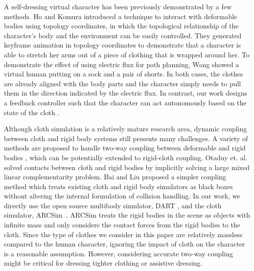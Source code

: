 A self-dressing virtual character has been previously demonstrated by a
few methods. Ho and Komura  introduced a technique
to interact with deformable bodies using topology coordinates, in which
the topological relationship of the character's body and the environment
can be easily controlled. They generated keyframe animation in topology
coordinates to demonstrate that a character is able to stretch her arms
out of a piece of clothing that is wrapped around her. To demonstrate the
effect of using electric flux for path planning, Wang \etal
{} showed a virtual human putting on a sock and a
pair of shorts. In both cases, the clothes are already aligned with the
body parts and the character simply needs to pull them in the direction
indicated by the electric flux.   In contrast, our
work designs a feedback controller such that the character can act
autonomously based on the state of the cloth .



Although cloth simulation is a relatively mature research area, dynamic
coupling between cloth and rigid body systems still presents many
challenges. A variety of methods are proposed to handle two-way coupling
between deformable and rigid bodies
\cite{Jansson:2003:CDR,Sifakis:2007:HSD,Shinar:2008:TCR,Otaduy:2009:ICH,Miguel:2011:ESC,Macklin:2014:unified},
which can be potentially extended to rigid-cloth coupling. Otaduy et. al.
\cite{Otaduy:2009:ICH} solved contacts between cloth and rigid bodies by
implicitly solving a large mixed linear complementarity problem. Bai and
Liu \cite{Bai:2014:CCR} proposed a simpler coupling method which treats
existing cloth and rigid body simulators as black boxes without altering
the internal formulation of collision handling.  In our work, we directly
use the open source multibody simulator, DART \cite{Liu:2012:STM}, and the
cloth simulator, ARCSim~\cite{Narain:2012:AAR,Narain:2013:FCA}. ARCSim
treats the rigid bodies in the scene as objects with infinite mass and
only considers the contact forces from the rigid bodies to the cloth.
Since the type of clothes we consider in this paper are relatively
massless compared to the human character, ignoring the impact of cloth on
the character is a reasonable assumption. However, considering accurate
two-way coupling might be critical for dressing tighter clothing or
assistive dressing.

